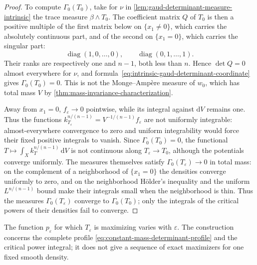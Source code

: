 \begin{proof}
To compute $\Gamma_0(T_0)$, take for $\nu$ in \cref{lem:gaud-determinant-measure-intrinsic} the trace measure $\beta\wedge T_0$. The coefficient matrix $Q$ of $T_0$ is then a positive multiple of the first matrix below on $\{x_1\neq0\}$, which carries the absolutely continuous part, and of the second on $\{x_1=0\}$, which carries the singular part:
\[
 \operatorname{diag}(1,0,\ldots,0),\qquad
 \operatorname{diag}(0,1,\ldots,1).
\]
Their ranks are respectively
one and $n-1$, both less than $n$. Hence $\det Q=0$ almost everywhere for $\nu$, and
formula~\eqref{eq:intrinsic-gaud-determinant-coordinate} gives
$\Gamma_0(T_0)=0$. This is not the Monge--Amp\`ere measure of
$w_0$, which has total mass $V$ by \cref{thm:mass-invariance-characterization}.

Away from $x_1=0$, $f_\varepsilon\to0$ pointwise, while its integral
against $\mathrm dV$ remains one. Thus the functions $k_{T_\varepsilon}^{n/(n-1)}=V^{-1/(n-1)}f_\varepsilon$ are not
uniformly integrable: almost-everywhere convergence to zero and
uniform integrability would force their fixed positive integrals to
vanish. Since $\Gamma_0(T_0)=0$, the functional $T\mapsto\int_X k_T^{n/(n-1)}\,\mathrm dV$ is not
continuous along $T_\varepsilon\to T_0$, although the potentials converge uniformly. The measures
themselves satisfy $\Gamma_0(T_\varepsilon)\to0$ in total mass:
on the complement of a neighborhood of $\{x_1=0\}$ the densities converge uniformly to zero,
and on the neighborhood H\"older's inequality and the uniform $L^{n/(n-1)}$ bound make their integrals small when the neighborhood is thin. Thus the measures $\Gamma_0(T_\varepsilon)$ converge to $\Gamma_0(T_0)$; only the integrals of the critical powers of their densities fail to converge.
\end{proof}

The function $p_\varepsilon$ for which $T_\varepsilon$ is maximizing varies with $\varepsilon$. The construction concerns the complete profile \eqref{eq:constant-mass-determinant-profile} and the critical power integral; it does not give a sequence of exact maximizers for one fixed smooth density.
